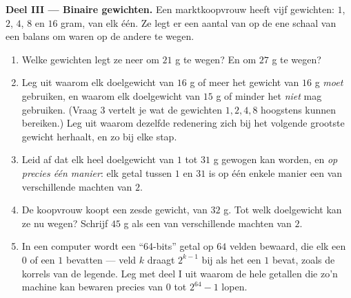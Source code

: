 \begin{problem}[{Weekendopgave --- de meetkundige \omterm{def:g1:addition:def}{som}
$1 + 2 + 4 + \dots + 2^{n-1} = 2^n - 1$, van een beroemde legende tot binaire
getallen}]
\medskip
\noindent\textbf{Deel III --- Binaire gewichten.}
Een marktkoopvrouw heeft vijf gewichten: $1$, $2$, $4$, $8$ en $16$ gram, van elk één.
Ze legt er een aantal van op de ene schaal van een balans om waren op de andere te
wegen.
\begin{enumerate}[resume]
  \item Welke gewichten legt ze neer om $21$ g te wegen? En om $27$ g te wegen?
  \item Leg uit waarom elk doelgewicht van $16$ g of meer het gewicht van $16$ g
        \emph{moet} gebruiken, en waarom elk doelgewicht van $15$ g of minder het
        \emph{niet} mag gebruiken. (Vraag 3 vertelt je wat de gewichten $1, 2, 4, 8$
        hoogstens kunnen bereiken.) Leg uit waarom dezelfde redenering zich bij het
        volgende grootste gewicht herhaalt, en zo bij elke stap.
  \item Leid af dat elk heel doelgewicht van $1$ tot $31$ g gewogen kan worden, en
        \emph{op precies één manier}: elk getal tussen $1$ en $31$ is op één enkele
        manier een  van verschillende machten van $2$.
  \item De koopvrouw koopt een zesde gewicht, van $32$ g. Tot welk doelgewicht kan ze
        nu wegen? Schrijf $45$ g als een  van verschillende machten van $2$.
  \item In een computer wordt een ``64-bits'' getal op $64$ velden bewaard, die elk een
        $0$ of een $1$ bevatten --- veld $k$ draagt $2^{k-1}$ bij als het een $1$
        bevat, zoals de korrels van de legende. Leg met deel I uit waarom de hele
        getallen die zo'n machine kan bewaren precies van $0$ tot $2^{64} - 1$ lopen.
\end{enumerate}
\end{problem}
